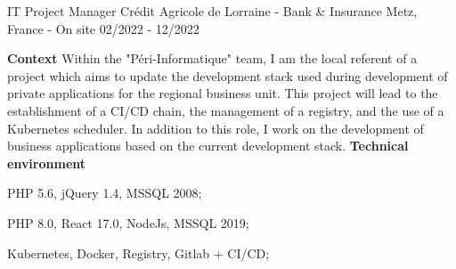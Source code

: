 \begin{cventries}
  \cventry
    {IT Project Manager} %
    {Crédit Agricole de Lorraine - Bank \& Insurance} %
    {Metz, France - On site} %
    {02/2022 - 12/2022} %
    {
      \textbf{Context}
      \newline
      Within the "Péri-Informatique" team, I am the local referent of a project which 
      aims to update the development stack used during development of private applications 
      for the regional business unit. This project will lead to the establishment of a 
      CI/CD chain, the management of a registry, and the use of a Kubernetes scheduler.
      \newline
      In addition to this role, I work on the development of business applications based 
      on the current development stack. 
      \newline \vspace{2pt}
      \textbf{Technical environment}
      \newline \vspace{12pt}
      \begin{cvitems}
        \item {PHP 5.6, jQuery 1.4, MSSQL 2008;}
        \item {PHP 8.0, React 17.0, NodeJs, MSSQL 2019;}
        \item {Kubernetes, Docker, Registry, Gitlab + CI/CD;}
      \end{cvitems}
    }


\end{cventries}
